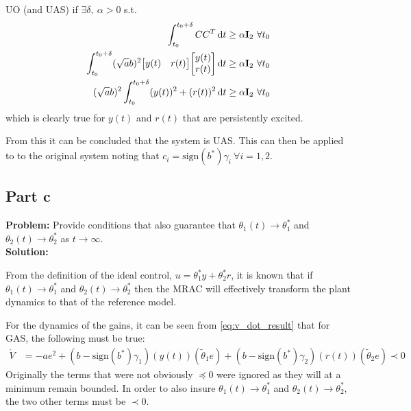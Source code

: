 \documentclass[letter]{article}
\begin{document}
UO (and UAS) if $\exists \delta, \ \alpha > 0$ s.t.
\begin{align}
	\int_{t_0}^{t_0+\delta} C C^T \dd{t}
	&\geq \alpha \vb{I}_2 \ \forall t_0\\
	\int_{t_0}^{t_0+\delta} (\sqrt{a} b)^2 \mqty[y(t) & r(t)] \mqty[y(t) \\ r(t)]  \dd{t}
	&\geq \alpha \vb{I}_2 \ \forall t_0\\
	(\sqrt{a} b)^2 \int_{t_0}^{t_0+\delta} (y(t))^2 + (r(t))^2 \dd{t}
	&\geq \alpha \vb{I}_2 \ \forall t_0
\end{align}
which is clearly true for $y(t)$ and $r(t)$ that are persistently excited.

From this it can be concluded that the system is UAS. This can then be applied to to the original system noting that $c_i = \text{sign}(b^*) \gamma_i \ \forall i = 1,2$.


\newpage
\subsection{Part c}
\textbf{Problem:}
Provide conditions that also guarantee that $\theta_1(t) \to \theta_1^*$ and $\theta_2(t) \to \theta_2^*$ as $t\to\infty$.\\

\noindent
\textbf{Solution:}

From the definition of the ideal control, $u = \theta_1^* y + \theta_2^* r$, it is known that if $\theta_1(t) \to \theta_1^*$ and $\theta_2(t) \to \theta_2^*$ then the MRAC will effectively transform the plant dynamics to that of the reference model.

For the dynamics of the gains, it can be seen from \eqref{eq:v_dot_result} that for GAS, the following must be true:
\begin{align}
	\dot{V} &= -a e^2 + (b-\text{sign}(b^*) \gamma_1) (y(t)) (\tilde{\theta}_1 e) + (b - \text{sign}(b^*) \gamma_2) (r(t)) (\tilde{\theta}_2 e) \prec 0
\end{align}
Originally the terms that were not obviously $\preceq 0$ were ignored as they will at a minimum remain bounded. In order to also insure $\theta_1(t) \to \theta_1^*$ and $\theta_2(t) \to \theta_2^*$, the two other terms must be $\prec 0$.










\newpage
\end{document}
